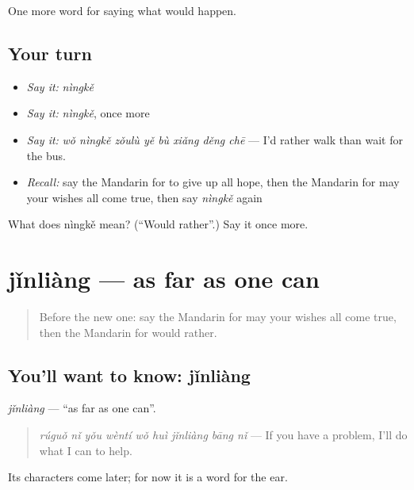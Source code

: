 \begin{grammarlens}[title={What you've built}]
One more word for saying what would happen.
\end{grammarlens}

\subsection*{Your turn}
\begin{itemize}
\raggedright
  \item \emph{Say it:} \emph{nìngkě}
  \item \emph{Say it:} \emph{nìngkě}, once more
  \item \emph{Say it:} \emph{wǒ nìngkě zǒulù yě bù xiǎng děng chē} — I'd rather walk than wait for the bus.
  \item \emph{Recall:} say the Mandarin for to give up all hope, then the Mandarin for may your wishes all come true, then say \emph{nìngkě} again
\end{itemize}

\begin{tcolorbox}[breakable,colback=teal!4,colframe=teal!35!black,title={Before you move on}]
What does nìngkě mean? (\textquotedblleft{}Would rather\textquotedblright{}.) Say it once more.
\end{tcolorbox}
\section[jǐnliàng]{jǐnliàng — as far as one can}

\label{lesson:ZH-C534-jinliang}



\begin{quote}
Before the new one: say the Mandarin for may your wishes all come true, then the Mandarin for would rather.
\end{quote}

\subsection*{You'll want to know: jǐnliàng}
\emph{jǐnliàng} — \textquotedblleft{}as far as one can\textquotedblright{}.

\begin{quote}
\emph{rúguǒ nǐ yǒu wèntí wǒ huì jǐnliàng bāng nǐ} — If you have a problem, I'll do what I can to help.
\end{quote}

Its characters come later; for now it is a word for the ear.

